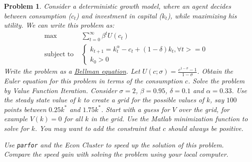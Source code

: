 \documentclass[12pt, a4paper]{article}
\newtheorem{problem}{Problem}
\begin{document}
\begin{problem}
Consider a deterministic growth model, where an agent decides between consumption (\(c_t\)) and investment in capital (\(k_t\)), while maximizing his utility.
We can write this problem as:
\begin{align*}
  \max&\sum_{t=0}^{\infty}\beta^tU(c_t)\\
  \text{subject to }&
                      \begin{cases}
                        k_{t+1} = k_t^{\alpha} - c_t + (1-\delta)k_t, \forall t >= 0\\
                        k_0 > 0
                      \end{cases}
\end{align*}
Write the problem as a \href{https://en.wikipedia.org/wiki/Bellman\_equation}{Bellman equation}.
Let \(U(c; \sigma)=\frac{c^{1-\sigma}-1}{1-\sigma}\).
Obtain the Euler equation for this problem in terms of the consumption \(c\).
Solve the problem by Value Function Iteration.
Consider \(\sigma=2\), \(\beta=0.95\), \(\delta=0.1\) and \(\alpha=0.33\).
Use the steady state value of \(k\) to create a grid for the possible values of \(k\), say \(100\) points between \(0.25 k^*\) and \(1.75 k^*\).
Start with a guess for \(V\) over the grid, for example \(V(k)=0\) for all \(k\) in the grid.
Use the Matlab minimization function to solve for \(k\).
You may want to add the constraint that \(c\) should always be positive.

Use \texttt{parfor} and the Econ Cluster to speed up the solution of this problem.
Compare the speed gain with solving the problem using your local computer.
\end{problem}

\newpage
\printbibliography
\newpage
\end{document}
